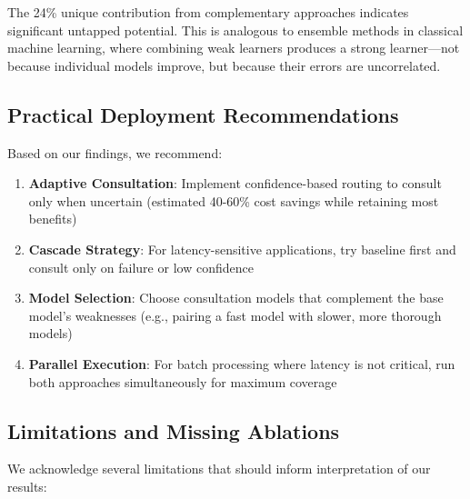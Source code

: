 \documentclass[11pt,a4paper]{article}
\begin{document}
The 24\% unique contribution from complementary approaches indicates significant untapped potential. This is analogous to ensemble methods in classical machine learning, where combining weak learners produces a strong learner---not because individual models improve, but because their errors are uncorrelated.

\subsection{Practical Deployment Recommendations}

Based on our findings, we recommend:
\begin{enumerate}
    \item \textbf{Adaptive Consultation}: Implement confidence-based routing to consult only when uncertain (estimated 40-60\% cost savings while retaining most benefits)
    \item \textbf{Cascade Strategy}: For latency-sensitive applications, try baseline first and consult only on failure or low confidence
    \item \textbf{Model Selection}: Choose consultation models that complement the base model's weaknesses (e.g., pairing a fast model with slower, more thorough models)
    \item \textbf{Parallel Execution}: For batch processing where latency is not critical, run both approaches simultaneously for maximum coverage
\end{enumerate}

\subsection{Limitations and Missing Ablations}

We acknowledge several limitations that should inform interpretation of our results:
\end{document}
